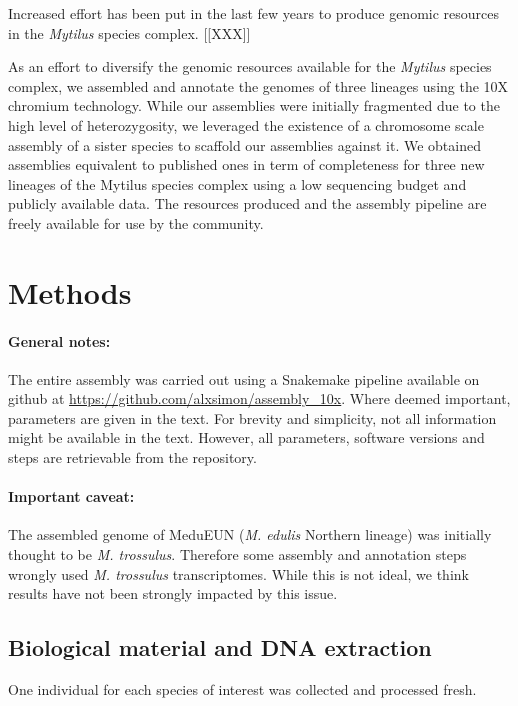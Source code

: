 \documentclass[11pt, a4paper]{article}
\begin{document}
Increased effort has been put in the last few years to produce genomic resources in the \textit{Mytilus} species complex.
[[XXX]]

As an effort to diversify the genomic resources available for the \textit{Mytilus} species complex,
we assembled and annotate the genomes of three lineages using the 10X chromium technology.
While our assemblies were initially fragmented due to the high level of heterozygosity,
we leveraged the existence of a chromosome scale assembly of a sister species to scaffold our assemblies against it.
We obtained assemblies equivalent to published ones in term of completeness for three new lineages of the Mytilus species complex using a low sequencing budget and publicly available data.
The resources produced and the assembly pipeline are freely available for use by the community.

\section{Methods}\label{methods}

\paragraph{General notes:}
The entire assembly was carried out using a Snakemake \parencite{Molder2021} pipeline available on github at \url{https://github.com/alxsimon/assembly_10x}.
Where deemed important, parameters are given in the text.
For brevity and simplicity, not all information might be available in the text.
However, all parameters, software versions and steps are retrievable from the repository.

\paragraph{Important caveat:}
The assembled genome of MeduEUN (\textit{M. edulis} Northern lineage) was initially thought to be \textit{M. trossulus}.
Therefore some assembly and annotation steps wrongly used \textit{M. trossulus} transcriptomes.
While this is not ideal, we think results have not been strongly impacted by this issue.


\subsection{Biological material and DNA extraction}

One individual for each species of interest was collected and processed fresh.
\end{document}
